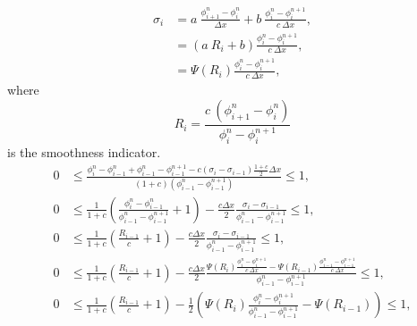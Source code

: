 \documentclass[../thesis.tex]{subfiles}
\begin{document}
\begin{equation}
    \begin{split}
        \sigma_{i} &= a~\frac{\phi_{i+1}^{n}-\phi_{i}^{n}}{\Delta x}
        + b~\frac{\phi_{i}^{n} - \phi_{i}^{n+1}}{c~\Delta x},
        \\
        &=\left( a~R_{i} + b \right)
        \frac{\phi_{i}^{n} - \phi_{i}^{n+1}}{c~\Delta x},
        \\
        &=\Psi(R_{i})\frac{\phi_{i}^{n} - \phi_{i}^{n+1}}{c~\Delta x},
    \end{split}
\end{equation}
where
\begin{equation}
    R_{i} =
    \frac{c~\left( \phi_{i+1}^{n}-\phi_{i}^{n} \right)}
    {\phi_{i}^{n} - \phi_{i}^{n+1}}
\end{equation}
is the smoothness indicator.
\begin{equation}
    \begin{split}
        0
        &\leq
        \frac{\phi_{i}^{n} -\phi_{i-1}^{n}
        +\phi_{i-1}^{n} - \phi_{i-1}^{n+1}
        -c\left(
            \sigma_{i} - \sigma_{i-1}
            \right)\frac{1+c}{2}\Delta x}
            {(1+c)\left( \phi_{i-1}^{n} - \phi_{i-1}^{n+1} \right)}
        \leq
        1,
        \\
        0
        &\leq
        \frac{1}{1+c}
        \left( \frac{\phi_{i}^{n} -\phi_{i-1}^{n}}
        {\phi_{i-1}^{n} - \phi_{i-1}^{n+1}} + 1 \right)
        - \frac{c\Delta x}{2}
        \frac{\sigma_{i} - \sigma_{i-1}}
        {\phi_{i-1}^{n} - \phi_{i-1}^{n+1}}
        \leq
        1,
        \\
        0
        &\leq
        \frac{1}{1+c}
        \left( \frac{R_{i-1}}{c} + 1 \right)
        - \frac{c\Delta x}{2}
        \frac{\sigma_{i} - \sigma_{i-1}}
        {\phi_{i-1}^{n} - \phi_{i-1}^{n+1}}
        \leq
        1,
        \\
        0
        &\leq
        \frac{1}{1+c}
        \left( \frac{R_{i-1}}{c} + 1 \right)
        - \frac{c\Delta x}{2}
        \frac{\Psi(R_{i})
        \frac{\phi_{i}^{n} - \phi_{i}^{n+1}}{c~\Delta x}
        - \Psi(R_{i-1})\frac{\phi_{i-1}^{n} - \phi_{i-1}^{n+1}}{c~\Delta x}}
        {\phi_{i-1}^{n} - \phi_{i-1}^{n+1}}
        \leq
        1,
        \\
        0
        &\leq
        \frac{1}{1+c}
        \left( \frac{R_{i-1}}{c} + 1 \right)
        - \frac{1}{2}\left(
        \Psi(R_{i})
        \frac{\phi_{i}^{n} - \phi_{i}^{n+1}}{\phi_{i-1}^{n} - \phi_{i-1}^{n+1}}
        - \Psi(R_{i-1}) \right)
        \leq
        1,
    \end{split}
\end{equation}
\end{document}

